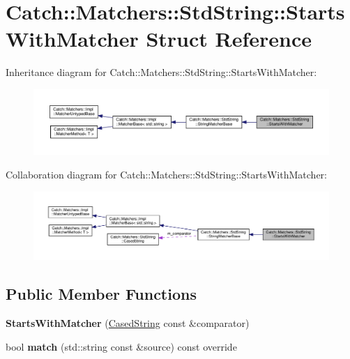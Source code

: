 \hypertarget{structCatch_1_1Matchers_1_1StdString_1_1StartsWithMatcher}{}\section{Catch\+::Matchers\+::Std\+String\+::Starts\+With\+Matcher Struct Reference}
\label{structCatch_1_1Matchers_1_1StdString_1_1StartsWithMatcher}


Inheritance diagram for Catch\+::Matchers\+::Std\+String\+::Starts\+With\+Matcher\+:\nopagebreak
\begin{figure}[H]
\begin{center}
\leavevmode
\includegraphics[width=350pt]{structCatch_1_1Matchers_1_1StdString_1_1StartsWithMatcher__inherit__graph}
\end{center}
\end{figure}


Collaboration diagram for Catch\+::Matchers\+::Std\+String\+::Starts\+With\+Matcher\+:\nopagebreak
\begin{figure}[H]
\begin{center}
\leavevmode
\includegraphics[width=350pt]{structCatch_1_1Matchers_1_1StdString_1_1StartsWithMatcher__coll__graph}
\end{center}
\end{figure}
\subsection*{Public Member Functions}
\begin{DoxyCompactItemize}
\item 
\mbox{\label{structCatch_1_1Matchers_1_1StdString_1_1StartsWithMatcher_a7b86f258bdbd131a6e7bcd94a8977325}} 
{\bfseries Starts\+With\+Matcher} (\mbox{\hyperlink{structCatch_1_1Matchers_1_1StdString_1_1CasedString}{Cased\+String}} const \&comparator)
\item 
\mbox{\label{structCatch_1_1Matchers_1_1StdString_1_1StartsWithMatcher_a7da4747aed0c48989d8be59a89e2b7fb}} 
bool {\bfseries match} (std\+::string const \&source) const override
\end{DoxyCompactItemize}
